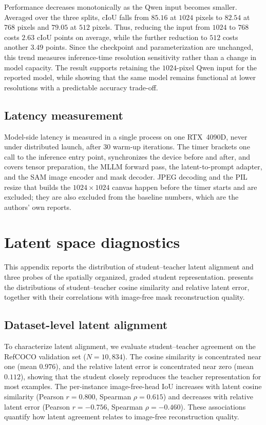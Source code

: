 Performance decreases monotonically as the Qwen input becomes smaller. Averaged over the three splits, cIoU falls from $85.16$ at $1024$ pixels to $82.54$ at $768$ pixels and $79.05$ at $512$ pixels. Thus, reducing the input from $1024$ to $768$ costs $2.63$ cIoU points on average, while the further reduction to $512$ costs another $3.49$ points. Since the checkpoint and parameterization are unchanged, this trend measures inference-time resolution sensitivity rather than a change in model capacity. The result supports retaining the $1024$-pixel Qwen input for the reported model, while showing that the same model remains functional at lower resolutions with a predictable accuracy trade-off.

\subsection{Latency measurement}
\label{sec:app_latency}

Model-side latency is measured in a single process on one RTX~4090D, never under distributed launch, after $30$ warm-up iterations. The timer brackets one call to the inference entry point, synchronizes the device before and after, and covers tensor preparation, the MLLM forward pass, the latent-to-prompt adapter, and the SAM image encoder and mask decoder. JPEG decoding and the PIL resize that builds the $1024\times1024$ canvas happen before the timer starts and are excluded; they are also excluded from the baseline numbers, which are the authors' own reports.

\section{Latent space diagnostics}
\label{sec:appendix_latent}

This appendix reports the distribution of student--teacher latent alignment and three probes of the spatially organized, graded student representation.  presents the
distributions of student--teacher cosine
similarity and relative latent error,
together with their correlations with
image-free mask reconstruction quality.

\subsection{Dataset-level latent alignment}
\label{sec:latent_diagnostics}

To characterize latent alignment, we evaluate student--teacher agreement on the RefCOCO validation set ($N=10{,}834$). The cosine similarity is concentrated near one (mean $0.976$), and the relative latent error is concentrated near zero (mean $0.112$), showing that the student closely reproduces the teacher representation for most examples. The per-instance image-free-head IoU increases with latent cosine similarity (Pearson $r=0.800$, Spearman $\rho=0.615$) and decreases with relative latent error (Pearson $r=-0.756$, Spearman $\rho=-0.460$). These associations quantify how latent agreement relates to image-free reconstruction quality.

